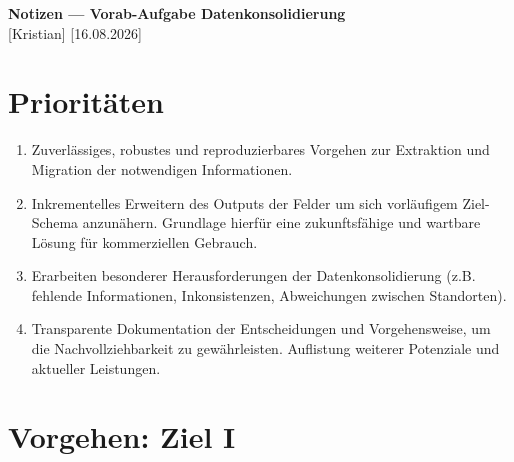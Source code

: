 \documentclass[11pt]{article}
\begin{document}
\begin{center}
    {\Large\bfseries Notizen --- Vorab-Aufgabe Datenkonsolidierung}\\[2pt]
    \small [Kristian] \hfill [16.08.2026]
\end{center}
\vspace{4pt}
\section{Prioritäten}
\begin{enumerate}
    \item Zuverlässiges, robustes und reproduzierbares Vorgehen zur Extraktion und Migration der notwendigen Informationen.
    \item Inkrementelles Erweitern des Outputs der Felder um sich vorläufigem Ziel-Schema anzunähern. Grundlage hierfür eine zukunftsfähige und wartbare Lösung für kommerziellen Gebrauch.
    \item Erarbeiten besonderer Herausforderungen der Datenkonsolidierung (z.B. fehlende Informationen, Inkonsistenzen, Abweichungen zwischen Standorten).
    \item Transparente Dokumentation der Entscheidungen und Vorgehensweise, um die Nachvollziehbarkeit zu gewährleisten. Auflistung weiterer Potenziale und aktueller Leistungen.
\end{enumerate}

\section{Vorgehen: Ziel I}
\end{document}
